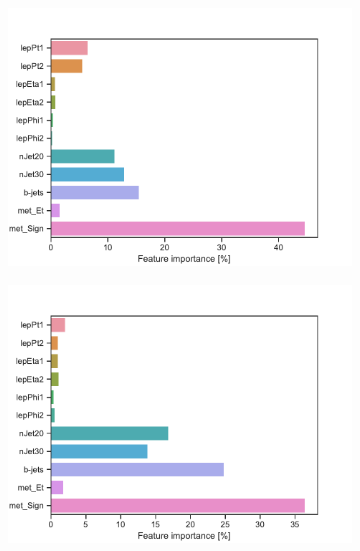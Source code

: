 \begin{figure}[H]
\begin{subfigure}[t!]{0.49\textwidth}
        \includegraphics[width = \textwidth]{Figures/WW/BDT/Low_level/High/featureImportance.pdf}
        \caption{}
        \label{fig:traintestscaled}
    \end{subfigure}
    \begin{subfigure}[t!]{0.49\textwidth}
        \includegraphics[width = \textwidth]{Figures/Mono_Z/ML/BDT/Low_level/High/featureImportance.pdf}
        \caption{}
        \label{fig:ROCBDTLow_low_level}
    \end{subfigure}
    \caption{}
    \label{fig:resExample}
\end{figure}

